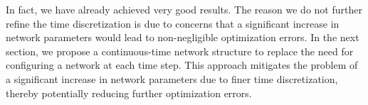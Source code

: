 \documentclass[11pt]{article}
\begin{document}
In fact, we have already achieved very good results. The reason we do not further refine the time discretization is due to concerns that a significant increase in network parameters would lead to non-negligible optimization errors.
In the next section, we propose a continuous-time network structure to replace the need for configuring a network at each time step. This approach mitigates the problem of a significant increase in network parameters due to finer time discretization, thereby potentially reducing further optimization errors.


\begin{table}[htbp]
	\centering
	\caption{Numerical Results for PricingDiffrate Equation}
	\label{dt_diffrate_results}
\end{table}
\end{document}
